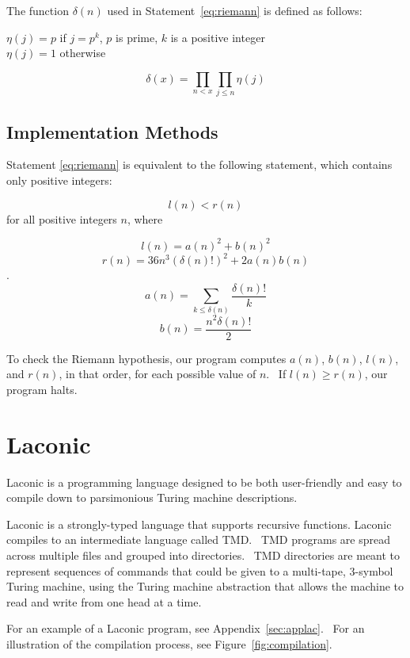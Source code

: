 \documentclass[11pt]{article}
\newenvironment{nscenter}
 {\parskip=0pt\par\nopagebreak\centering}
 {\par\noindent\ignorespacesafterend}
\begin{document}
The function $\delta(n)$ used in Statement~\ref{eq:riemann} is defined as follows:

\begin{nscenter}
$\eta(j) = p$ if $j = p^k$, $p$ is prime, $k$ is a positive integer \\
$\eta(j) = 1$ otherwise
\end{nscenter}
$$\delta(x) = \prod_{n<x}\prod_{j \le n} \eta(j)$$

\subsection{Implementation Methods}

Statement \ref{eq:riemann} is equivalent to the following statement, which contains only positive integers\footnotemark:

$$l(n) < r(n)$$ for all positive integers $n$, where

$$l(n) = a(n)^2 + b(n)^2$$
$$r(n) = 36n^3(\delta(n)!)^2 + 2a(n)b(n)$$.
$$a(n) = \sum_{k \le \delta(n)} \frac{\delta(n)!}{k}$$
$$b(n) = \frac{n^2 \delta(n)!}{2}$$

To check the Riemann hypothesis, our program computes $a(n)$, $b(n)$, $l(n)$, and $r(n)$, in that order, for each possible value of $n$. \ If $l(n) \ge r(n)$, our program halts.

\section{Laconic}

Laconic is a programming language designed to be both user-friendly and easy to compile down to parsimonious Turing machine descriptions.

Laconic is a strongly-typed language that supports recursive functions. Laconic compiles to an intermediate language called TMD. \ TMD programs are spread across multiple files and grouped into directories. \ TMD directories are meant to represent sequences of commands that could be given to a multi-tape, $3$-symbol Turing machine, using the Turing machine abstraction that allows the machine to read and write from one head at a time.

For an example of a Laconic program, see Appendix~\ref{sec:applac}. \ For an illustration of the compilation process, see Figure~\ref{fig:compilation}.
\end{document}
